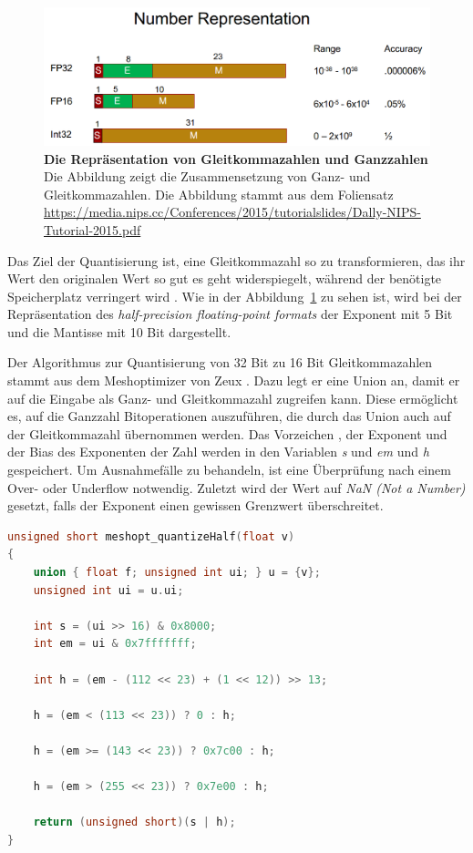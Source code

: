 \begin{figure}[htb]
  \centering  
  \includegraphics[scale=0.50]{Bilder/number_representation.png}
  \caption[Die Repräsentation von Gleitkommazahlen und Ganzzahlen]{\textbf{Die Repräsentation von Gleitkommazahlen und Ganzzahlen} Die Abbildung zeigt die Zusammensetzung von Ganz- und Gleitkommazahlen. Die Abbildung stammt aus dem Foliensatz \url{https://media.nips.cc/Conferences/2015/tutorialslides/Dally-NIPS-Tutorial-2015.pdf}}
  \label{fig:number_representation}
\end{figure}

Das Ziel der Quantisierung ist, eine Gleitkommazahl so zu transformieren, das ihr Wert den originalen Wert so gut es geht widerspiegelt, während der benötigte Speicherplatz verringert wird \cite{Kapoulkine2010}.
Wie in der Abbildung~\ref{fig:number_representation} zu sehen ist, wird bei der Repräsentation des \textit{half-precision floating-point formats} der Exponent mit 5 Bit und die Mantisse mit 10 Bit dargestellt. \newline

Der Algorithmus zur Quantisierung von 32 Bit zu 16 Bit Gleitkommazahlen stammt aus dem Meshoptimizer von Zeux \cite{Zeux}.
Dazu legt er eine Union an, damit er auf die Eingabe als Ganz- und Gleitkommazahl zugreifen kann.
Diese ermöglicht es, auf die Ganzzahl Bitoperationen auszuführen, die durch das Union auch auf der Gleitkommazahl übernommen werden.
Das Vorzeichen , der Exponent und der Bias des Exponenten der Zahl werden in den Variablen \textit{s} und \textit{em} und \textit{h} gespeichert. 
Um Ausnahmefälle zu behandeln, ist eine Überprüfung nach einem Over- oder Underflow notwendig.
Zuletzt wird der Wert auf \textit{NaN (Not a Number)} gesetzt, falls der Exponent einen gewissen Grenzwert überschreitet. \newpage
\begin{lstlisting}[language = C++, caption = Quantisierung von Float zu Half, label=lst:floatToHalf]
unsigned short meshopt_quantizeHalf(float v)
{
	union { float f; unsigned int ui; } u = {v};
	unsigned int ui = u.ui;

	int s = (ui >> 16) & 0x8000;
	int em = ui & 0x7fffffff;

	int h = (em - (112 << 23) + (1 << 12)) >> 13;

	h = (em < (113 << 23)) ? 0 : h;

	h = (em >= (143 << 23)) ? 0x7c00 : h;

	h = (em > (255 << 23)) ? 0x7e00 : h;

	return (unsigned short)(s | h);
}
\end{lstlisting}

